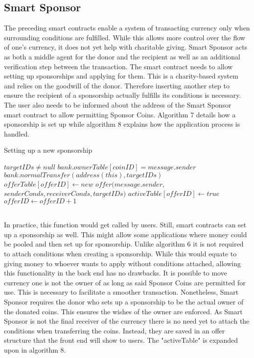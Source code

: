 \subsection{Smart Sponsor}
The preceding smart contracts enable a system of transacting currency only when surrounding conditions are fulfilled. While this allows more control over the flow of one's currency, it does not yet help with charitable giving. Smart Sponsor acts as both a middle agent for the donor and the recipient as well as an additional verification step between the transaction. The smart contract needs to allow setting up sponsorships and applying for them. This is a charity-based system and relies on the goodwill of the donor. Therefore inserting another step to ensure the recipient of a sponsorship actually fulfills its conditions is necessary. The user also needs to be informed about the address of the Smart Sponsor smart contract to allow permitting Sponsor Coins. Algorithm 7 details how a sponsorship is set up while algorithm 8 explains how the application process is handled.\\
\begin{algorithm}
\caption{Setting up a new sponsorship}\label{alg:sponsor}
\begin{algorithmic}
\Require $targetIDs \neq null$
\Ensure $bank.ownerTable[coinID] = message.sender$
\EndFor \\
$bank.normalTransfer(address(this), targetIDs)$
\State $offerTable[offerID] \gets new$ $offer(message.sender,$\\ 
\hspace{70pt} $senderConds, receiverConds, targetIDs)$
\State $activeTable[offerID] \gets true$
\State $offerID \gets offerID + 1$
\end{algorithmic}
\end{algorithm}
\\
In practice, this function would get called by users. Still, smart contracts can set up a sponsorship as well. This might allow some applications where money could be pooled and then set up for sponsorship. Unlike algorithm 6 it is not required to attach conditions when creating a sponsorship. While this would equate to giving money to whoever wants to apply without conditions attached, allowing this functionality in the back end has no drawbacks. It is possible to move currency one is not the owner of as long as said Sponsor Coins are permitted for use. This is necessary to facilitate a smoother transaction. Nonetheless, Smart Sponsor requires the donor who sets up a sponsorship to be the actual owner of the donated coins. This ensures the wishes of the owner are enforced. As Smart Sponsor is not the final receiver of the currency there is no need yet to attach the conditions when transferring the coins. Instead, they are saved in an offer structure that the front end will show to users. The "activeTable" is expanded upon in algorithm 8.\\
